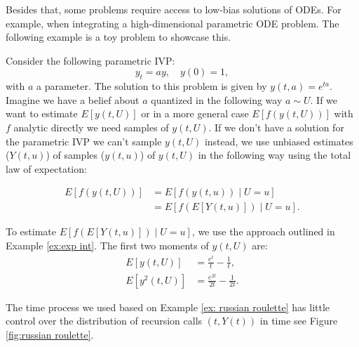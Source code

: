 \documentclass[a4paper,12pt]{article}
\begin{document}
Besides that, some problems require access to low-bias solutions of
ODEs. For example, when integrating a high-dimensional parametric ODE problem.
The following example is a toy problem to showcase this.

\begin{example} \label{ex:random ode}
  Consider the following parametric IVP:
  \begin{equation}\label{eq:random ode}
    y_t = ay, \quad y(0)=1,
  \end{equation}
  with $a$ a parameter. The solution to this problem is given by
  $y(t,a) = e^{ta}$. Imagine we have a belief about $a$ quantized
  in the following way $a\sim U$. If we want
  to estimate $E[y(t, U)]$ or in a more general case
  $E[f(y(t, U))]$ with $f$ analytic directly
  we need samples of $y(t,U)$. If we don't have a solution for the parametric IVP
  we can't sample $y(t,U)$ instead, we use unbiased estimates ($Y(t,u)$) of samples ($y(t,u)$)
  of $y(t, U)$ in the following
  way using the total law of expectation:

  \begin{align}
    E[f(y(t,U))] & = E[f(y(t,u)) \mid U=u]     \\
                 & = E[f(E[Y(t,u)]) \mid U=u].
  \end{align}

  To estimate $E[f(E[Y(t,u)]) \mid U =u]$, we use the approach outlined in
  Example \ref{ex:exp int}. The first two moments of $y(t, U)$ are:
  \begin{align}
    E[y(t,U)]      & = \frac{e^t}{t} - \frac{1}{t},      \\
    E[y^{2}(t, U)] & = \frac{e^{2t}}{2t} - \frac{1}{2t}.
  \end{align}
\end{example}

\begin{pythonn}
\end{pythonn}

\vspace{0.5cm}

The time process we used based on Example \ref{ex: russian roulette}
has little control over the distribution of recursion calls $(t,Y(t))$
in time see Figure \ref{fig:russian roulette}.
\end{document}
